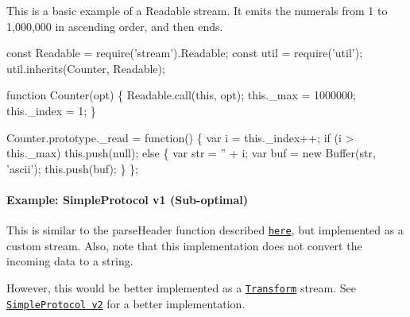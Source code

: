 This is a basic example of a Readable stream. It emits the numerals from 1 to 1,000,000 in ascending order, and then ends.


\begin{DoxyCode}
const Readable = require('stream').Readable;
const util = require('util');
util.inherits(Counter, Readable);

function Counter(opt) \{
  Readable.call(this, opt);
  this.\_max = 1000000;
  this.\_index = 1;
\}

Counter.prototype.\_read = function() \{
  var i = this.\_index++;
  if (i > this.\_max)
    this.push(null);
  else \{
    var str = '' + i;
    var buf = new Buffer(str, 'ascii');
    this.push(buf);
  \}
\};
\end{DoxyCode}


\paragraph*{Example\+: Simple\+Protocol v1 (Sub-\/optimal)}

This is similar to the {\ttfamily parse\+Header} function described \href{#stream_readable_unshift_chunk}{\tt here}, but implemented as a custom stream. Also, note that this implementation does not convert the incoming data to a string.

However, this would be better implemented as a \href{#stream_class_stream_transform}{\tt Transform} stream. See \href{#stream_example_simpleprotocol_parser_v2}{\tt Simple\+Protocol v2} for a better implementation.


